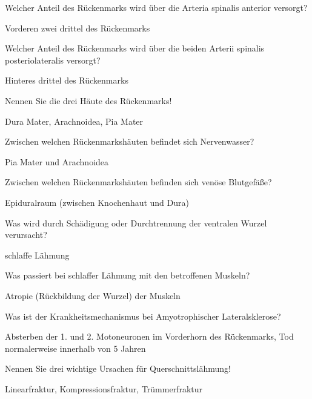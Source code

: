 \documentclass[10pt, a4paper]{exam}
\newcommand\Warning{%
 \makebox[1.4em][c]{%
 \makebox[0pt][c]{\raisebox{.1em}{\small!}}%
 \makebox[0pt][c]{\color{red}\Large$\bigtriangleup$}}}%
\begin{document}
\begin{questions}
  \question Welcher Anteil des Rückenmarks wird über die Arteria spinalis anterior versorgt?
  \begin{solution}
    Vorderen zwei drittel des Rückenmarks \Warning
  \end{solution}

  \question Welcher Anteil des Rückenmarks wird über die beiden Arterii spinalis posteriolateralis versorgt?
  \begin{solution}
    Hinteres drittel des Rückenmarks \Warning
  \end{solution}

  \question Nennen Sie die drei Häute des Rückenmarks!
  \begin{solution}
    Dura Mater, Arachnoidea, Pia Mater
  \end{solution}

  \question Zwischen welchen Rückenmarkshäuten befindet sich Nervenwasser?
  \begin{solution}
    Pia Mater und Arachnoidea
  \end{solution}

  \question Zwischen welchen Rückenmarkshäuten befinden sich venöse Blutgefäße?
  \begin{solution}
    Epiduralraum (zwischen Knochenhaut und Dura)
  \end{solution}

  \question Was wird durch Schädigung oder Durchtrennung der ventralen Wurzel verursacht?
  \begin{solution}
    schlaffe Lähmung
  \end{solution}

  \question Was passiert bei schlaffer Lähmung mit den betroffenen Muskeln?
  \begin{solution}
    Atropie (Rückbildung der Wurzel) der Muskeln
  \end{solution}

  \question Was ist der Krankheitsmechanismus bei Amyotrophischer Lateralsklerose?
  \begin{solution}
    Absterben der 1. und 2. Motoneuronen im Vorderhorn des Rückenmarks, Tod normalerweise
    innerhalb von 5 Jahren
  \end{solution}

  \question Nennen Sie drei wichtige Ursachen für Querschnittslähmung!
  \begin{solution}
    Linearfraktur, Kompressionsfraktur, Trümmerfraktur
  \end{solution}


\end{questions}
\end{document}
